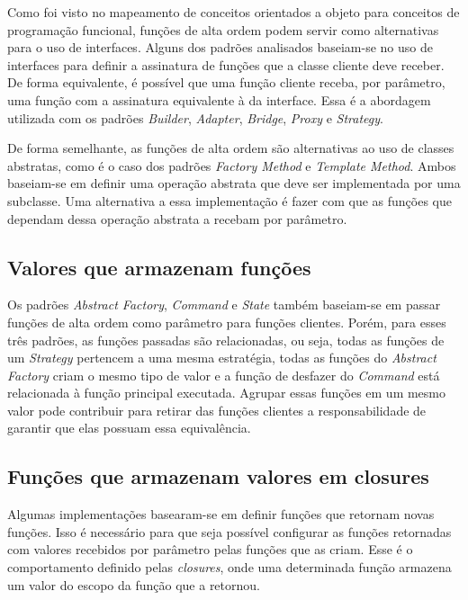 Como foi visto no mapeamento de conceitos orientados 
a objeto para conceitos de programação funcional, 
funções de alta ordem podem servir como alternativas 
para o uso de interfaces. Alguns dos padrões analisados 
baseiam-se no uso de interfaces para definir a assinatura 
de funções que a classe cliente deve receber. De forma 
equivalente, é possível que uma função cliente receba, 
por parâmetro, uma função com a assinatura equivalente 
à da interface. Essa é a abordagem utilizada com os 
padrões \textit{Builder}, \textit{Adapter}, \textit{Bridge}, 
\textit{Proxy} e \textit{Strategy}. 

De forma semelhante, as funções de alta ordem são 
alternativas ao uso de 
classes abstratas, como é o caso dos padrões 
\textit{Factory Method} e \textit{Template Method}. 
Ambos baseiam-se 
em definir uma operação abstrata que deve ser 
implementada por uma subclasse. Uma alternativa 
a essa implementação é fazer com que as funções 
que dependam dessa operação abstrata a recebam 
por parâmetro.

\subsection{Valores que armazenam funções}

Os padrões \textit{Abstract Factory}, \textit{Command} e 
\textit{State} também baseiam-se em passar funções de 
alta ordem como parâmetro para funções clientes. 
Porém, para esses três padrões, as funções 
passadas são relacionadas, ou seja, 
todas as funções de um \textit{Strategy} pertencem a uma mesma 
estratégia, todas as funções do \textit{Abstract Factory} criam 
o mesmo tipo de valor e a função de desfazer do 
\textit{Command} está relacionada à função principal executada. 
Agrupar essas funções em um mesmo valor pode 
contribuir para retirar das funções clientes a 
responsabilidade de garantir que elas possuam 
essa equivalência.

\subsection{Funções que armazenam valores em closures}

Algumas implementações basearam-se em definir funções 
que retornam novas funções. Isso é necessário para 
que seja possível configurar as funções retornadas 
com valores recebidos por parâmetro pelas funções 
que as criam. Esse é o comportamento definido pelas 
\textit{closures}, onde uma determinada função armazena 
um valor do escopo da função que a retornou. 

